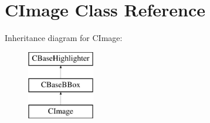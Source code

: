 \hypertarget{class_c_image}{}\section{C\+Image Class Reference}
\label{class_c_image}
Inheritance diagram for C\+Image\+:\begin{figure}[H]
\begin{center}
\leavevmode
\includegraphics[height=3.000000cm]{class_c_image}
\end{center}
\end{figure}
